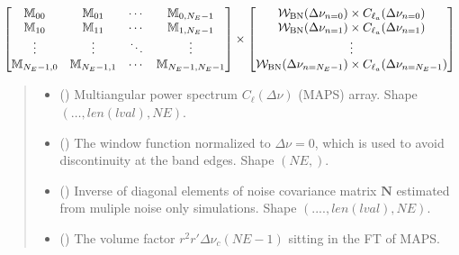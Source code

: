 \documentclass[a4paper,11pt,oneside,english,openany]{sphinxmanual}
\begin{document}
\begin{fulllineitems}
\begin{equation*}
\begin{split}
\begin{align*}
\begin{bmatrix}
    \mathbb{M}_{00} & \mathbb{M}_{01} & \cdots & \mathbb{M}_{0,N_E-1}\\
    \mathbb{M}_{10} & \mathbb{M}_{11} & \cdots & \mathbb{M}_{1,N_E-1}\\
    \vdots & \vdots & \ddots & \vdots \\
    \mathbb{M}_{N_E-1,0} & \mathbb{M}_{N_E-1,1} & \cdots & \mathbb{M}_{N_E-1,N_E-1}\\
\end{bmatrix} \times
\begin{bmatrix}
    \mathcal{W}_{\rm BN}(\Delta\nu_{n=0}) \times C_{\ell_a}(\Delta\nu_{n=0})\\
    \mathcal{W}_{\rm BN}(\Delta\nu_{n=1}) \times C_{\ell_a}(\Delta\nu_{n=1})\\
    \vdots\\
    \mathcal{W}_{\rm BN}(\Delta\nu_{n=N_E-1}) \times C_{\ell_a}(\Delta\nu_{n=N_E -1})\\
\end{bmatrix}
\end{align*}\end{split}
\end{equation*}\begin{quote}\begin{description}
\begin{itemize}
\item {} 
\sphinxAtStartPar
{} () \textendash{} Multi\sphinxhyphen{}angular power spectrum \(C_{\ell}(\Delta\nu)\) (MAPS) array. Shape \((\dots,len(lval),N\!E)\).

\item {} 
\sphinxAtStartPar
{} () \textendash{} The window function normalized to \(\Delta\nu = 0\), which is used to avoid discontinuity at the band edges. Shape \((N\!E,)\).

\item {} 
\sphinxAtStartPar
{} () \textendash{} Inverse of diagonal elements of noise covariance matrix \(\mathbf{N}\) estimated from muliple noise only simulations. Shape \((....,len(lval),N\!E)\).

\item {} 
\sphinxAtStartPar
{} () \textendash{} The volume factor \(r^2r'\Delta\nu_c(N\!E-1)\) sitting in the FT of MAPS.


\end{itemize}
\end{description}
\end{quote}
\end{fulllineitems}
\end{document}
